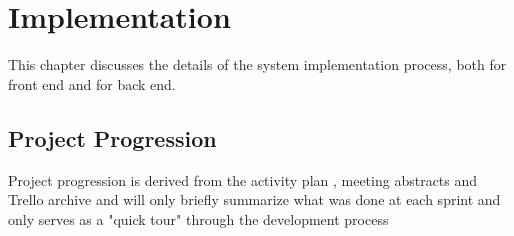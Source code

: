 
\chapter{Implementation}

This chapter discusses the details of the system implementation process, both for front end and for back end.


\section{Project Progression}
Project progression is derived from the activity plan , meeting abstracts  and Trello archive   and will only briefly summarize what was done at each sprint and only serves as a "quick tour" through the development process  

